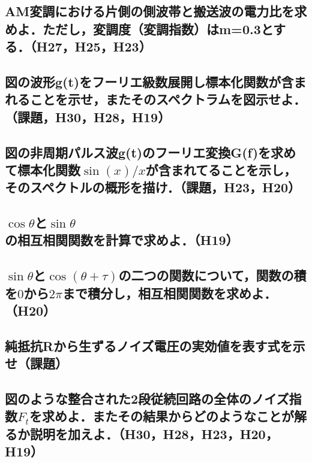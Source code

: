 \subsection{AM変調における片側の側波帯と搬送波の電力比を求めよ．ただし，変調度（変調指数）はm=0.3とする．（H27，H25，H23）}
\vspace{7cm}

\newpage
\subsection{図の波形g(t)をフーリエ級数展開し標本化関数が含まれることを示せ，またそのスペクトラムを図示せよ．（課題，H30，H28，H19）}
\vspace{11cm}

\subsection{図の非周期パルス波g(t)のフーリエ変換G(f)を求めて標本化関数$\sin(x) / x$が含まれてることを示し，そのスペクトルの概形を描け．（課題，H23，H20）}
\vspace{11cm}

\newpage
\subsection{$\cos \theta$と$\sin \theta$の相互相関関数を計算で求めよ．（H19）}
\vspace{11cm}

\subsection{$\sin \theta$と$\cos(\theta + \tau)$の二つの関数について，関数の積を$0$から$2 \pi$まで積分し，相互相関関数を求めよ．（H20）}
\vspace{11cm}

\newpage
\subsection{純抵抗Rから生ずるノイズ電圧の実効値を表す式を示せ（課題）}
\vspace{7cm}

\subsection{図のような整合された2段従続回路の全体のノイズ指数$F_t$を求めよ．またその結果からどのようなことが解るか説明を加えよ．（H30，H28，H23，H20，H19）}
\vspace{7cm}

